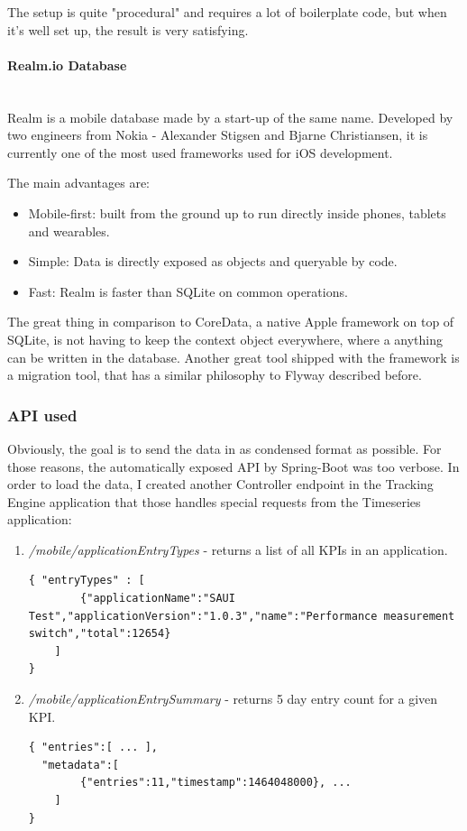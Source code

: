 The setup is quite "procedural" and requires a lot of boilerplate code, but when it's well set up, the result is very satisfying.

\newpage

\paragraph{Realm.io Database}\mbox{}\\

Realm is a mobile database made by a start-up of the same name. Developed by two engineers from Nokia - Alexander Stigsen and Bjarne Christiansen, it is currently one of the most used frameworks used for iOS development. 

The main advantages are:

\begin{itemize}
	\item Mobile-first: built from the ground up to run directly inside phones, tablets and wearables.
	\item Simple: Data is directly exposed as objects and queryable by code.
	\item Fast: Realm is faster than SQLite on common operations.
\end{itemize}

The great thing in comparison to CoreData, a native Apple framework on top of SQLite, is not having to keep the context object everywhere, where a anything can be written in the database. Another great tool shipped with the framework is a migration tool, that has a similar philosophy to Flyway described before.

\subsubsection{API used}

Obviously, the goal is to send the data in as condensed format as possible. For those reasons, the automatically exposed API by Spring-Boot was too verbose. In order to load the data, I created another Controller endpoint in the Tracking Engine application that those handles special requests from the Timeseries application:

\begin{enumerate}
	\item \emph{/mobile/applicationEntryTypes} - returns a list of all KPIs in an application.
	
\begin{lstlisting}
{ "entryTypes" : [
		{"applicationName":"SAUI Test","applicationVersion":"1.0.3","name":"Performance measurement switch","total":12654}
	]
}	
\end{lstlisting}	
	
	\item \emph{/mobile/applicationEntrySummary} - returns 5 day entry count for a given KPI.
	
\begin{lstlisting}
{ "entries":[ ... ],
  "metadata":[
		{"entries":11,"timestamp":1464048000}, ...
	]
}
\end{lstlisting}	
\end{enumerate}

